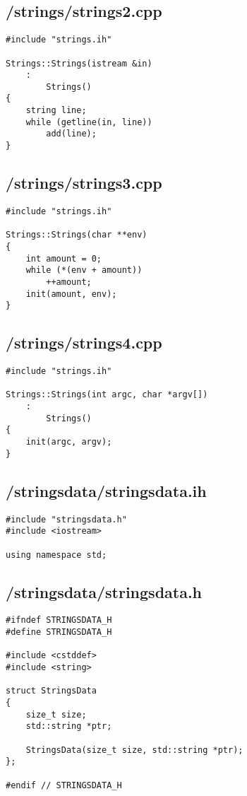 \documentclass{article}
\begin{document}
\subsection*{/strings/strings2.cpp}
\begin{verbatim}
#include "strings.ih"

Strings::Strings(istream &in)
    :
        Strings()
{
    string line;
    while (getline(in, line))
        add(line);
}

\end{verbatim}
\subsection*{/strings/strings3.cpp}
\begin{verbatim}
#include "strings.ih"

Strings::Strings(char **env)
{
    int amount = 0;
    while (*(env + amount))
        ++amount;
    init(amount, env);
}
\end{verbatim}
\subsection*{/strings/strings4.cpp}
\begin{verbatim}
#include "strings.ih"

Strings::Strings(int argc, char *argv[])
    :
        Strings()
{
    init(argc, argv);
}
\end{verbatim}

\subsection*{/stringsdata/stringsdata.ih}
\begin{verbatim}
#include "stringsdata.h"
#include <iostream>

using namespace std;

\end{verbatim}
\subsection*{/stringsdata/stringsdata.h}
\begin{verbatim}
#ifndef STRINGSDATA_H
#define STRINGSDATA_H

#include <cstddef>
#include <string>

struct StringsData 
{
    size_t size;
    std::string *ptr;

    StringsData(size_t size, std::string *ptr);
};

#endif // STRINGSDATA_H

\end{verbatim}
\end{document}

